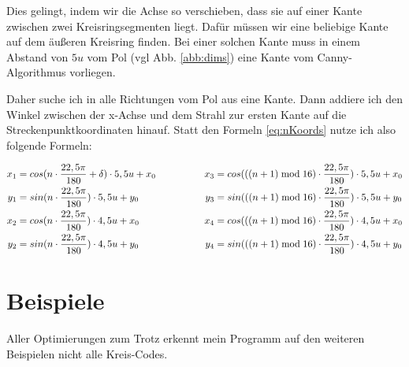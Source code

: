 Dies gelingt, indem wir die Achse so verschieben, dass sie auf einer Kante zwischen zwei Kreisringsegmenten liegt. Dafür müssen wir eine beliebige Kante auf dem äußeren Kreisring finden. Bei einer solchen Kante muss in einem Abstand von \(5u\) vom Pol (vgl Abb. \ref{abb:dims}) eine Kante vom Canny-Algorithmus vorliegen.

Daher suche ich in alle Richtungen vom Pol aus eine Kante. Dann addiere ich den Winkel zwischen der x-Achse und dem Strahl zur ersten Kante auf die Streckenpunktkoordinaten hinauf. Statt den Formeln \eqref{eq:nKoords} nutze ich also folgende Formeln:

\begin{gather}
	\begin{split}
		x_1 &= cos(n \cdot \frac{22,5\pi}{180} + \delta) \cdot 5,5u + x_0\\
		y_1 &= sin(n \cdot \frac{22,5\pi}{180}) \cdot 5,5u + y_0\\ \vspace{2em}
		x_2 &= cos(n \cdot \frac{22,5\pi}{180}) \cdot 4,5u + x_0\\
		y_2 &= sin(n \cdot \frac{22,5\pi}{180}) \cdot 4,5u + y_0
	\end{split}
	\hspace{5em}
	\begin{split}
		x_3 &= cos(((n+1)\bmod{}16) \cdot \frac{22,5\pi}{180}) \cdot 5,5u + x_0\\
		y_3 &= sin(((n+1)\bmod{}16) \cdot \frac{22,5\pi}{180}) \cdot 5,5u + y_0 \\ \vspace{2em}
		x_4 &= cos(((n+1)\bmod{}16) \cdot \frac{22,5\pi}{180}) \cdot 4,5u + x_0\\
		y_4 &= sin(((n+1)\bmod{}16) \cdot \frac{22,5\pi}{180}) \cdot 4,5u + y_0
	\end{split} \label{eq:nKoords}
\end{gather}
\section{Beispiele}
Aller Optimierungen zum Trotz erkennt mein Programm auf den weiteren Beispielen nicht alle Kreis-Codes.